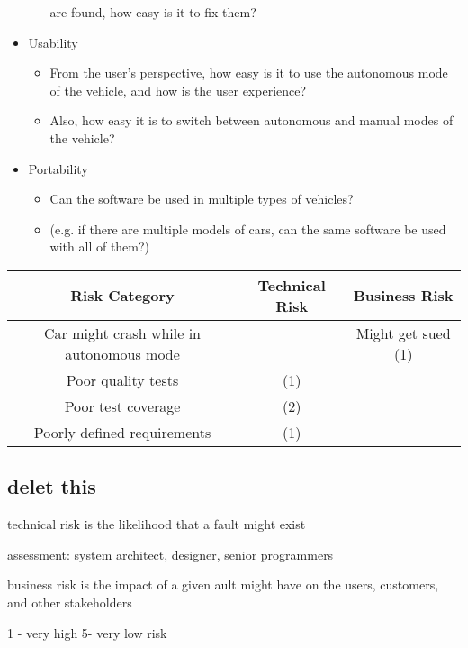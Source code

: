 \documentclass[letterpaper]{article}
\begin{document}
\begin{itemize}
\begin{itemize}
		are found, how easy is it to fix them?
	\end{itemize}
	\item Usability
	\begin{itemize}	
	\item From the user's perspective, how easy is it to use the autonomous mode of the vehicle, and how is the user experience?
		\item Also, how easy it is to switch between autonomous and manual modes of the vehicle?
	\end{itemize}
	\item Portability
	\begin{itemize}	
	\item Can the software be used in multiple types of vehicles? 
		\item (e.g. if there are multiple models of cars, can the same software be used with all of them?)
	\end{itemize}
\end{itemize}

\begin{table}[H]
\centering
\begin{tabular}{c|c|c|}
Risk Category & Technical Risk & Business Risk \\ \hline
Car might crash while in autonomous mode &  & Might get sued (1)  \\ \hline
Poor quality tests & (1)  &  \\ \hline
Poor test coverage & (2) &  \\ \hline
Poorly defined requirements & (1) & \\ \hline
\end{tabular}
\end{table}

\subsection{delet this}
technical risk is the likelihood that a fault might exist

assessment: system architect, designer, senior programmers


business risk is the impact of a given ault might have on the users,
customers, and other stakeholders

1 - very high 5- very low risk

\section{}
\end{document}
